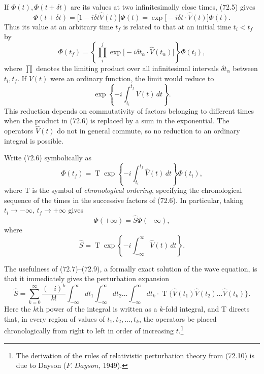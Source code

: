 If $\Phi(t),\Phi(t+\delta t)$ are its values at two infinitesimally close times, (72.5) gives
\[
\Phi(t+\delta t)=\bigl[1-i\delta t\hat V(t)\bigr]\Phi(t)
=\exp\bigl[-i\delta t\cdot\hat V(t)\bigr]\Phi(t).
\]
Thus its value at an arbitrary time $t_f$ is related to that at an initial time $t_i<t_f$ by
\begin{equation}
\Phi(t_f)=\left\{\prod_i^f\exp\bigl[-i\delta t_\alpha\cdot\hat V(t_\alpha)\bigr]\right\}\Phi(t_i),
\tag{72.6}
\end{equation}
where $\prod$ denotes the limiting product over all infinitesimal intervals $\delta t_\alpha$ between $t_i,t_f$. If $V(t)$ were an ordinary function, the limit would reduce to
\[
\exp\left\{-i\int_{t_i}^{t_f}V(t)\,dt\right\}.
\]
This reduction depends on commutativity of factors belonging to different times when the product in (72.6) is replaced by a sum in the exponential. The operators $\hat V(t)$ do not in general commute, so no reduction to an ordinary integral is possible.

Write (72.6) symbolically as
\begin{equation}
\Phi(t_f)=\mathop{\mathrm T}\exp\left\{-i\int_{t_i}^{t_f}\hat V(t)\,dt\right\}\Phi(t_i),
\tag{72.7}
\end{equation}
where $\mathrm T$ is the symbol of \emph{chronological ordering}, specifying the chronological sequence of the times in the successive factors of (72.6). In particular, taking $t_i\to-\infty$, $t_f\to+\infty$ gives
\begin{equation}
\Phi(+\infty)=\hat S\Phi(-\infty),
\label{eq:72.8}
\tag{72.8}
\end{equation}
where
\begin{equation}
\hat S=\mathop{\mathrm T}\exp\left\{-i\int_{-\infty}^{\infty}\hat V(t)\,dt\right\}.
\tag{72.9}
\end{equation}

The usefulness of (72.7)--(72.9), a formally exact solution of the wave equation, is that it immediately gives the perturbation expansion
\begin{equation}
\hat S=\sum_{k=0}^{\infty}\frac{(-i)^k}{k!}
\int_{-\infty}^{\infty}dt_1\int_{-\infty}^{\infty}dt_2\ldots
\int_{-\infty}^{\infty}dt_k\cdot
\mathop{\mathrm T}\bigl\{\hat V(t_1)\hat V(t_2)\ldots\hat V(t_k)\bigr\}.
\label{eq:72.10}
\tag{72.10}
\end{equation}
Here the $k$th power of the integral is written as a $k$-fold integral, and $\mathrm T$ directs that, in every region of values of $t_1,t_2,\ldots,t_k$, the operators be placed chronologically from right to left in order of increasing $t$.\footnote{The derivation of the rules of relativistic perturbation theory from (72.10) is due to Dayson ($F.~Dayson$, 1949).}

